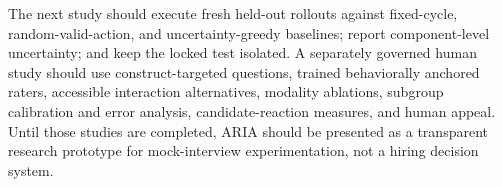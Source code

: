 \documentclass[journal]{IEEEtran}
\begin{document}
The next study should execute fresh held-out rollouts against fixed-cycle, random-valid-action, and uncertainty-greedy baselines; report component-level uncertainty; and keep the locked test isolated. A separately governed human study should use construct-targeted questions, trained behaviorally anchored raters, accessible interaction alternatives, modality ablations, subgroup calibration and error analysis, candidate-reaction measures, and human appeal. Until those studies are completed, ARIA should be presented as a transparent research prototype for mock-interview experimentation, not a hiring decision system.




\end{document}
